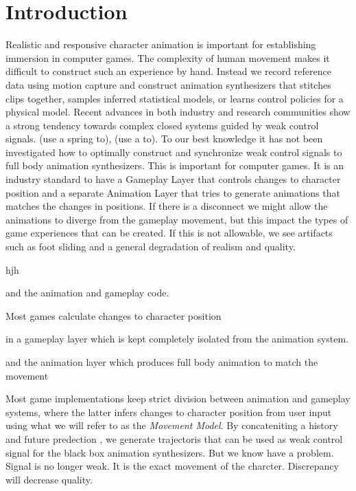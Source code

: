 \section{Introduction}
Realistic and responsive character animation is important for establishing immersion in computer games. The complexity of human movement makes it difficult to construct such an experience by hand. Instead we record reference data using motion capture and construct animation synthesizers that stitches clips together, samples inferred statistical models, or learns control policies for a physical model. Recent advances in both industry and research communities show a strong tendency towards complex closed systems guided by weak control signals. (use a spring to), (use a to).
To our best knowledge it has not been investigated how to optimally construct and synchronize weak control signals to full body animation synthesizers. This is important for computer games. It is an industry standard to have a Gameplay Layer that controls changes to character position and a separate Animation Layer that tries to generate animations that matches the changes in positions. If there is a disconnect we might allow the animations to diverge from the gameplay movement, but this impact the types of game experiences that can be created. If this is not allowable, we see artifacts such as foot sliding and a general degradation of realism and quality.

hjh




and   the animation and gameplay code.

Most games calculate changes to character position 

in a gameplay layer which is kept completely isolated from the animation system. 


and the animation layer which produces full body animation to match the movement  





Most game implementations keep strict division between animation and gameplay systems, where the latter infers changes to character position from user input using what we will refer to as the \textit{Movement Model}. By concateniting a history and future predection , we generate trajectoris that can be used as weak control signal for the black box animation synthesizers. But we know have a problem. Signal is no longer weak. It is the exact movement of the charcter. Discrepancy will decrease quality. 

